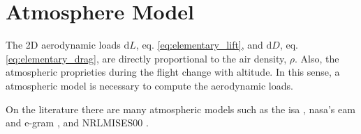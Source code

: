 \section{Atmosphere Model}
\label{section:atmosphere_model}

The 2D aerodynamic loads $\mathrm{d}L$, eq. \ref{eq:elementary_lift}, and  $\mathrm{d}D$, eq. \ref{eq:elementary_drag}, are directly proportional to the air density, $\rho$. Also, the atmospheric proprieties during the flight change with altitude. In this sense, a atmospheric model is necessary to compute the aerodynamic loads.

On the literature there are many atmospheric models such as the \gls{isa} \cite{noauthor_iso_nodate}, \gls{nasa}'s \gls{eam} \cite {noauthor_earth_nodate} and \gls{e-gram} \cite{white_earth_2021}, and NRLMISES00 \cite{picone_nrlmsise00_2002}.

